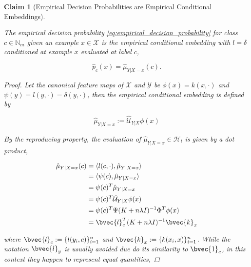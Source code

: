 \documentclass{article}
\newtheorem{claim}{Claim}[theorem]
\begin{document}
	\begin{claim}[Empirical Decision Probabilities are Empirical Conditional Embeddings]
	\label{thm:empirical_probability_is_embedding}
	
		The empirical decision probability \eqref{eq:empirical_decision_probability} for class $c \in \mathbb{N}_{m}$ given an example $x \in \mathcal{X}$ is the empirical conditional embedding with $l = \delta$ conditioned at example $x$ evaluated at label $c$,
			
		\begin{equation}
			\hat{p}_{c}(x) = \hat{\mu}_{Y | X = x}(c).
		\end{equation}
			
			
		\begin{proof}
			
			Let the canonical feature maps of $\mathcal{X}$ and $\mathcal{Y}$ be $\phi(x) = k(x, \cdot)$ and $\psi(y) = l(y, \cdot) = \delta(y, \cdot)$, then the empirical conditional embedding is defined by
			
			\begin{equation}
				\hat{\mu}_{Y | X = x} := \hat{\mathcal{U}}_{Y | X} \phi(x)
			\end{equation}
			
			By the reproducing property, the evaluation of $\hat{\mu}_{Y | X = x} \in \mathcal{H}_{l}$ is given by a dot product,
	
			\begin{equation}
			\begin{aligned}
				\hat{\mu}_{Y | X = x}(c) &= \langle l(c, \cdot), \hat{\mu}_{Y | X = x} \rangle \\
				&= \langle \psi(c), \hat{\mu}_{Y | X = x} \rangle \\
				&= \psi(c)^{T} \hat{\mu}_{Y | X = x} \\
				&= \psi(c)^{T} \hat{\mathcal{U}}_{Y | X} \phi(x) \\
				&= \psi(c)^{T} \Psi (K + n \lambda I)^{-1} \Phi^{T} \phi(x) \\
				&= \bvec{l}_{c}^{T} (K + n \lambda I)^{-1} \bvec{k}_{x} \\
			\end{aligned}
			\end{equation}
			
			where $\bvec{l}_{c} := \{l(y_{i}, c)\}_{i = 1}^{n}$ and $\bvec{k}_{x} := \{k(x_{i}, x)\}_{i = 1}^{n}$. While the notation $\bvec{l}_{y}$ is usually avoided due do its similarity to $\bvec{1}_{c}$, in this context they happen to represent equal quantities,
			

\end{proof}
\end{claim}
\end{document}
